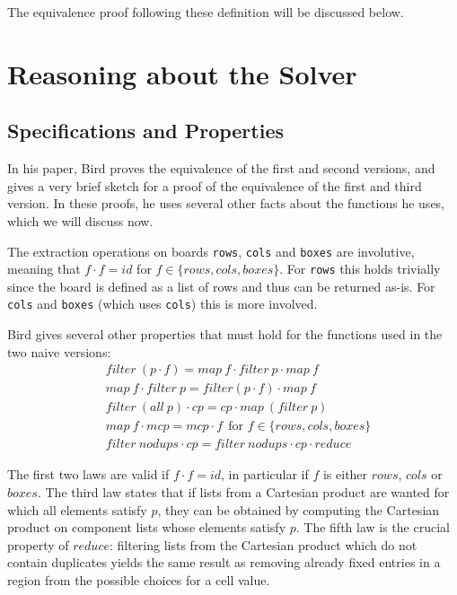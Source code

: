 \documentclass[a4paper,11pt]{article}
\begin{document}
The equivalence proof following these definition will be discussed below.

\section{Reasoning about the Solver}
\label{sec:reas}


\subsection{Specifications and Properties}
In his paper, Bird proves the equivalence of the first and second versions, and gives a very brief sketch for a proof of the equivalence of the first and third version. In these proofs, he uses several other facts about the functions he uses, which we will discuss now.
 
The extraction operations on boards \texttt{rows}, \texttt{cols} and \texttt{boxes} are involutive, meaning that \(f \cdot f = id\) for \(f \in \{rows,cols,boxes\}\). For \texttt{rows} this holds trivially since the board is defined as a list of rows and thus can be returned as-is. For \texttt{cols} and \texttt{boxes} (which uses \texttt{cols}) this is more involved. 

Bird gives several other properties that must hold for the functions used in the two naive versions:
\begin{align}
  &filter~(p \cdot f) = map~f \cdot filter~p \cdot map~f\\
  &map~f \cdot filter~p = filter (p \cdot f ) \cdot map~f\\
  &filter~(all~p) \cdot cp = cp \cdot map~(filter~p)\\
  &map~f \cdot mcp = mcp \cdot f~~\text{for \(f \in \{rows,cols,boxes\}\)}\\
  &filter~nodups \cdot cp = filter~nodups \cdot cp \cdot reduce
\end{align}

The first two laws are valid if \(f \cdot f = id\), in particular if \(f\) is either \(rows\), \(cols\) or \(boxes\).
The third law states that if lists from a Cartesian product are wanted for which all elements satisfy \(p\), they can be obtained by computing the Cartesian product on component lists whose elements satisfy \(p\).
The fifth law is the crucial property of \(reduce\): filtering lists from the Cartesian product which do not contain duplicates yields the same result as removing already fixed entries in a region from the possible choices for a cell value. 
\end{document}
